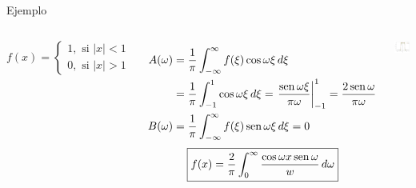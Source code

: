 \documentclass[9pt, aspectratio=169]{beamer}
\begin{document}
\begin{frame}{Ejemplo}
\begin{columns}[c]
\cx
\[ f(x) =
    \begin{cases}
    1, \text{ si } |x| < 1 \\
    0, \text{ si } |x| > 1 
    \end{cases} 
\]

\begin{align*}
    A(\omega) &= \frac{1}{\pi} \int_{-\infty}^{\infty} f(\xi) \cos \omega \xi \, d\xi \\
              &= \frac{1}{\pi} \int_{-1}^{1}  \cos \omega \xi \, d\xi = \left. \frac{\operatorname{sen} \omega \xi}{\pi \omega} \right|_{-1}^1 = \frac{2 \operatorname{sen} \omega}{\pi \omega} \\
    B(\omega) &= \frac{1}{\pi} \int_{-\infty}^{\infty} f(\xi) \operatorname{sen} \omega \xi \, d\xi = 0 
\end{align*}
\[    \boxed{ f(x) = \frac{2}{\pi} \int_0^{\infty} \frac{\cos \omega x \operatorname{sen} \omega}{w} \, d\omega } \]
\cx
\begin{center}
    \includegraphics[scale=0.45]{figs/fig-02.pdf}
\end{center}
\end{columns}
\end{frame}
\end{document}
